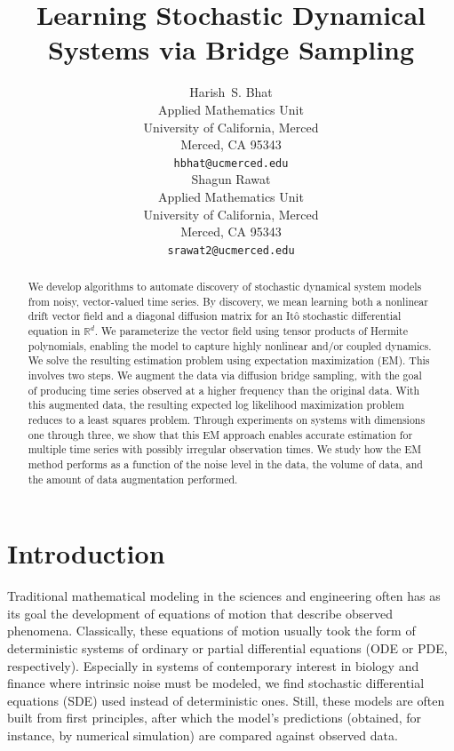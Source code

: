 \documentclass{article}
\title{Learning Stochastic Dynamical Systems via Bridge Sampling}
\author{
 Harish~S. Bhat\\
 Applied Mathematics Unit\\
 University of California, Merced\\
 Merced, CA 95343\\
 \texttt{hbhat@ucmerced.edu} \\
 \And
 Shagun Rawat\\
 Applied Mathematics Unit\\
 University of California, Merced\\
 Merced, CA 95343\\
 \texttt{srawat2@ucmerced.edu}
}
\begin{document}
\maketitle


\begin{abstract}
  We develop algorithms to automate discovery of stochastic dynamical system
  models from noisy, vector-valued time series.  By discovery, we mean 
  learning both a nonlinear drift vector field and a diagonal diffusion matrix 
  for an It\^{o} stochastic differential equation in $\mathbb{R}^d$.  We 
  parameterize the vector field using tensor products of Hermite polynomials,
  enabling the model to capture highly nonlinear and/or coupled dynamics.
  We solve the resulting estimation problem using expectation maximization (EM).
  This involves two steps.  We augment the data via diffusion bridge
  sampling, with the goal of producing time series observed at a higher
  frequency than the original data.  With this augmented data,
  the resulting expected log likelihood maximization problem
  reduces to a least squares problem.  Through experiments on systems with 
  dimensions one through three, we show that this EM approach enables 
  accurate estimation for multiple time series with possibly irregular 
  observation times.  We study how the EM method performs as a function of
  the noise level in the data, the volume of data, and the amount of data
  augmentation performed.  
\end{abstract}

\section{Introduction}
Traditional mathematical modeling in the sciences and engineering often has as its goal the development of equations of motion that describe observed phenomena.  Classically, these equations of motion usually took the form of deterministic systems of ordinary or partial differential equations (ODE or PDE, respectively).  Especially in systems of contemporary interest in biology and finance where intrinsic noise must be modeled, we find stochastic differential equations (SDE) used instead of deterministic ones.  Still, these models are often built from first principles, after which the model's predictions (obtained, for instance, by numerical simulation) are compared against observed data.
\end{document}
